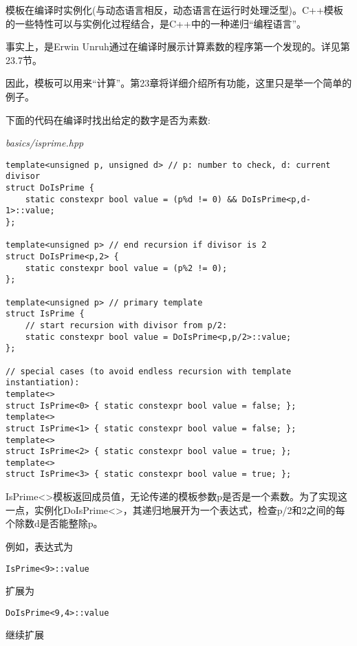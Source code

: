 模板在编译时实例化(与动态语言相反，动态语言在运行时处理泛型)。C++模板的一些特性可以与实例化过程结合，是C++中的一种递归“编程语言”。

\begin{tcolorbox}[colback=webgreen!5!white,colframe=webgreen!75!black]
\hspace*{0.75cm}事实上，是Erwin Unruh通过在编译时展示计算素数的程序第一个发现的。详见第23.7节。
\end{tcolorbox}

因此，模板可以用来“计算”。第23章将详细介绍所有功能，这里只是举一个简单的例子。

下面的代码在编译时找出给定的数字是否为素数:

\noindent
\textit{basics/isprime.hpp}
\begin{lstlisting}[style=styleCXX]
template<unsigned p, unsigned d> // p: number to check, d: current divisor
struct DoIsPrime {
	static constexpr bool value = (p%d != 0) && DoIsPrime<p,d-1>::value;
};

template<unsigned p> // end recursion if divisor is 2
struct DoIsPrime<p,2> {
	static constexpr bool value = (p%2 != 0);
};

template<unsigned p> // primary template
struct IsPrime {
	// start recursion with divisor from p/2:
	static constexpr bool value = DoIsPrime<p,p/2>::value;
};

// special cases (to avoid endless recursion with template instantiation):
template<>
struct IsPrime<0> { static constexpr bool value = false; };
template<>
struct IsPrime<1> { static constexpr bool value = false; };
template<>
struct IsPrime<2> { static constexpr bool value = true; };
template<>
struct IsPrime<3> { static constexpr bool value = true; };
\end{lstlisting}

IsPrime<>模板返回成员值，无论传递的模板参数p是否是一个素数。为了实现这一点，实例化DoIsPrime<>，其递归地展开为一个表达式，检查p/2和2之间的每个除数d是否能整除p。

例如，表达式为

\begin{lstlisting}[style=styleCXX]
IsPrime<9>::value
\end{lstlisting}

扩展为

\begin{lstlisting}[style=styleCXX]
DoIsPrime<9,4>::value
\end{lstlisting}

继续扩展

